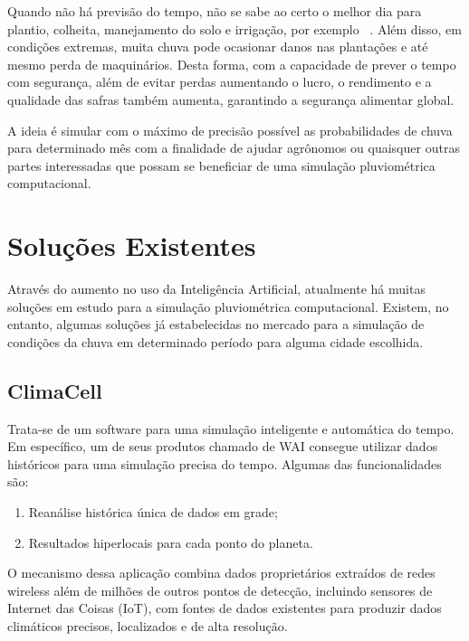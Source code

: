 Quando não há previsão do tempo, não se sabe ao certo o melhor dia para plantio, 
colheita, manejamento do solo e irrigação, por exemplo ~\cite{artigo_importancia}. Além disso, em condições extremas, muita chuva pode ocasionar danos nas plantações e até mesmo perda de maquinários.
Desta forma, com a capacidade de prever o tempo com segurança, além de evitar perdas aumentando o lucro, o rendimento e a qualidade das safras também aumenta, garantindo a segurança alimentar global.

A ideia é simular com o máximo de precisão possível as probabilidades de chuva para determinado mês com a finalidade de ajudar agrônomos ou quaisquer outras partes interessadas que possam se beneficiar de uma simulação pluviométrica computacional.

\section{Soluções Existentes}
\label{s.solucoes}

Através do aumento no uso da Inteligência Artificial, atualmente há muitas soluções em estudo para a simulação pluviométrica computacional. Existem, no entanto, algumas soluções já estabelecidas no mercado para a simulação de condições da chuva em determinado período para alguma cidade escolhida.

\subsection{ClimaCell}
\label{ss.climacell}
Trata-se de um software para uma simulação inteligente e automática do tempo. Em específico, um de seus produtos chamado de WAI consegue utilizar dados históricos para uma simulação precisa do tempo. Algumas das funcionalidades são:
\begin{enumerate}
  \item Reanálise histórica única de dados em grade;
  \item Resultados hiperlocais para cada ponto do planeta.
\end{enumerate}

O mecanismo dessa aplicação combina dados proprietários extraídos de redes wireless além de milhões de outros pontos de detecção, incluindo sensores de Internet das Coisas (IoT), com fontes de dados existentes para produzir dados climáticos precisos, localizados e de alta resolução.

